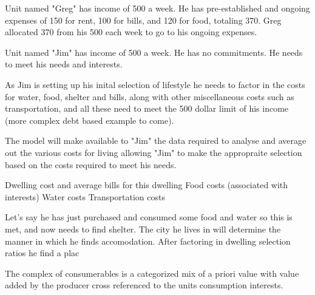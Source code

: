 


Unit named "Greg" has income of 500 a week. He has pre-established and ongoing expenses of 150 for rent, 100 for bills, and 120 for food, totaling 370. Greg allocated 370 from his 500 each week to go to his ongoing expenses. 

Unit named "Jim" has income of 500 a week. He has no commitments. He needs to meet his needs and interests. 

As Jim is setting up his inital selection of lifestyle he needs to factor in the costs for water, food, shelter and bills, along with other miscellaneous costs such as transportation, and all these need to meet the 500 dollar limit of his income (more complex debt based example to come).

The model will make available to "Jim" the data required to analyse and average out the various costs for living allowing "Jim" to make the appropraite selection based on the costs required to meet his needs.

Dwelling cost and average bills for this dwelling
Food costs (associated with interests)
Water costs
Transportation costs 




Let's say he has just purchased and consumed some food and water so this is met, and now needs to find shelter. The city he lives in will determine the manner in which he finds accomodation. After factoring in dwelling selection ratios he find a plac








The complex of consumerables is a categorized mix of a priori value with value added by the producer cross referenced to the units consumption interests.

